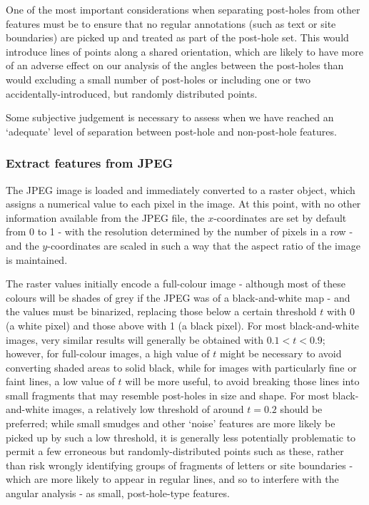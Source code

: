 \documentclass[../../ArchStats.tex]{subfiles}
\begin{document}
One of the most important considerations when separating post-holes from other features must be to ensure that no regular annotations (such as text or site boundaries) are picked up and treated as part of the post-hole set. This would introduce lines of points along a shared orientation, which are likely to have more of an adverse effect on our analysis of the angles between the post-holes than would excluding a small number of post-holes or including one or two accidentally-introduced, but randomly distributed points.

Some subjective judgement is necessary to assess when we have reached an `adequate' level of separation between post-hole and non-post-hole features. 



\subsubsection{Extract features from JPEG}

The JPEG image is loaded and immediately converted to a raster object, which assigns a numerical value to  each pixel in the image. At this point, with no other information available from the JPEG file, the $x$-coordinates are set by default from 0 to 1 - with the resolution determined by the number of pixels in a row - and the $y$-coordinates are scaled in such a way that the aspect ratio of the image is maintained.

The raster values initially encode a full-colour image - although most of these colours will be shades of grey if the JPEG was of a black-and-white map - and the values must be binarized, replacing those below a certain threshold $t$ with 0 (a white pixel) and those above with 1 (a black pixel). For most black-and-white images, very similar results will generally be obtained with $0.1 < t < 0.9$; however, for full-colour images, a high value of $t$ might be necessary to avoid converting shaded areas to solid black, while for images with particularly fine or faint lines, a low value of $t$ will be more useful, to avoid  breaking those lines into small fragments that may resemble post-holes in size and shape. For most black-and-white images, a relatively low threshold of around $t = 0.2$ should be preferred; while small smudges and other `noise' features are more likely be picked up by such a low threshold, it is generally less potentially problematic to permit a few erroneous but randomly-distributed points such as these, rather than risk wrongly identifying groups of fragments of letters or site boundaries - which are more likely to appear in regular lines, and so to interfere with the angular analysis - as small, post-hole-type features.
\end{document}
